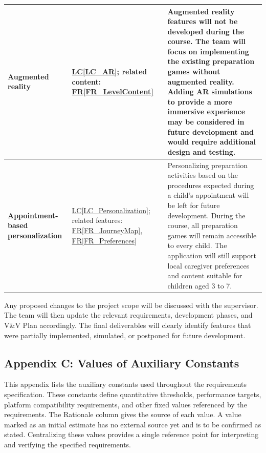 \documentclass[10pt]{article}
\newcommand{\rref}[1]{\hyperref[#1]{FR\ref*{#1}}}
\newcommand{\lcref}[1]{\hyperref[#1]{LC\ref*{#1}}}
\begin{document}
\begin{longtable}{@{}>{\raggedright\arraybackslash}p{}
>{\raggedright\arraybackslash}p{}
>{\raggedright\arraybackslash}p{}@{}}
\textbf{Augmented reality} &
\lcref{LC_AR};
related content:
\rref{FR_LevelContent} &
Augmented reality features will not be developed
during the course. The team will focus on
implementing the existing preparation games
without augmented reality. Adding AR simulations
to provide a more immersive experience may be
considered in future development and would
require additional design and testing. \\
\midrule

\textbf{Appointment-based personalization} &
\lcref{LC_Personalization};
related features:
\rref{FR_JourneyMap},
\rref{FR_Preferences} &
Personalizing preparation activities based on
the procedures expected during a child's
appointment will be left for future development.
During the course, all preparation games will
remain accessible to every child. The application
will still support local caregiver preferences
and content suitable for children aged 3 to 7. \\

\end{longtable}
\endgroup

Any proposed changes to the project scope will be
discussed with the supervisor. The team will then
update the relevant requirements, development phases,
and V\&V Plan accordingly. The final deliverables will
clearly identify features that were partially implemented,
simulated, or postponed for future development.

\newpage
\subsection{Appendix C: Values of Auxiliary Constants}
\label{sec_Constants}

This appendix lists the auxiliary constants used throughout the
requirements specification. These constants define quantitative
thresholds, performance targets, platform compatibility requirements,
and other fixed values referenced by the requirements. The Rationale
column gives the source of each value. A value marked as an initial estimate
has no external source yet and is to be confirmed as stated. Centralizing
these values provides a single reference point for interpreting and
verifying the specified requirements.
\end{document}
